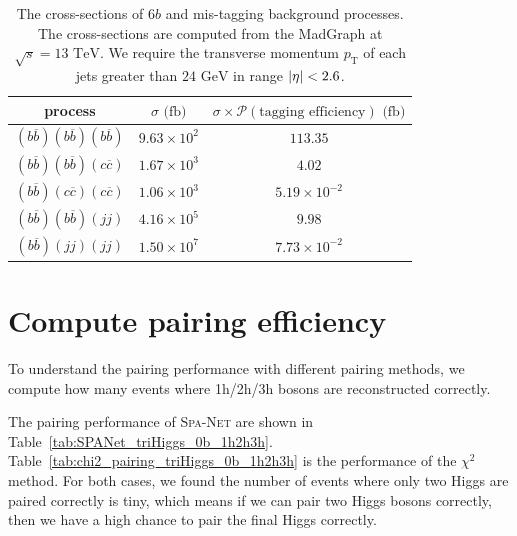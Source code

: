 \documentclass[12pt]{article}
\begin{document}
    \begin{table}[htpb]
        \centering
        \caption{The cross-sections of $6b$ and mis-tagging background processes. The cross-sections are computed from the MadGraph at $\sqrt{s} = 13 \text{ TeV}$. We require the transverse momentum $p_{\text{T}}$ of each jets greater than $\text{24 GeV}$ in range $\abs{\eta} < 2.6$.}
        \label{tab:cross_section_of_mis_tagging_background_w_cuts}
        \begin{tabular}{c|cc}
        process                                         & $\sigma\text{ (fb)}$ & $\sigma\times\mathcal{P}(\text{tagging efficiency})\text{ (fb)}$ \\ \hline
        $(b\overline{b})(b\overline{b})(b\overline{b})$ & $9.63 \times 10^{2}$ & $113.35$                                                         \\
        $(b\overline{b})(b\overline{b})(c\overline{c})$ & $1.67 \times 10^{3}$ & $4.02$                                                           \\
        $(b\overline{b})(c\overline{c})(c\overline{c})$ & $1.06 \times 10^{3}$ & $5.19 \times 10^{-2}$                                            \\
        $(b\overline{b})(b\overline{b})(jj)$            & $4.16 \times 10^{5}$ & $9.98$                                                           \\
        $(b\overline{b})(jj)(jj)$                       & $1.50 \times 10^{7}$ & $7.73 \times 10^{-2}$
        \end{tabular}
    \end{table}
\section{Compute pairing efficiency}%
\label{sec:compute_pairing_efficiency}
    To understand the pairing performance with different pairing methods, we compute how many events where 1h/2h/3h bosons are reconstructed correctly.

    The pairing performance of \textsc{Spa-Net} are shown in Table~\ref{tab:SPANet_triHiggs_0b_1h2h3h}. Table~\ref{tab:chi2_pairing_triHiggs_0b_1h2h3h} is the performance of the $\chi^2$ method. For both cases, we found the number of events where only two Higgs are paired correctly is tiny, which means if we can pair two Higgs bosons correctly, then we have a high chance to pair the final Higgs correctly.
\end{document}
